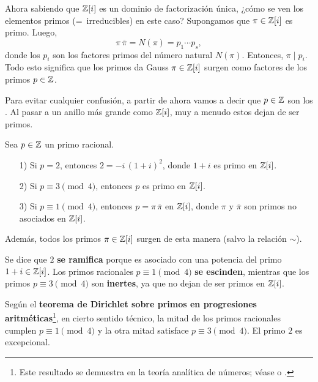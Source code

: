 Ahora sabiendo que $\mathbb{Z} [i]$ es un dominio de factorización única, ¿cómo se ven
los elementos primos (=~irreducibles) en este caso? Supongamos que
$\pi \in \mathbb{Z} [i]$ es primo. Luego,
$$\pi \, \overline{\pi} = N (\pi) = p_1\cdots p_s,$$
donde los $p_i$ son los factores primos del número natural $N (\pi)$. Entonces,
$\pi \mid p_i$. Todo esto significa que los primos da Gauss $\pi \in \mathbb{Z} [i]$
surgen como factores de los primos $p \in \mathbb{Z}$.

Para evitar cualquier confusión, a partir de ahora vamos a decir que $p\in \mathbb{Z}$
son los . Al pasar a un anillo más grande como
$\mathbb{Z} [i]$, muy a menudo estos dejan de ser primos.

\begin{proposicion}
  Sea $p \in \mathbb{Z}$ un primo racional.

  \begin{itemize}
  \item[1)] Si $p = 2$, entonces $2 = -i\,(1+i)^2$, donde $1+i$ es primo
    en $\mathbb{Z} [i]$.

  \item[2)] Si $p \equiv 3 \pmod{4}$, entonces $p$ es primo en $\mathbb{Z} [i]$.

  \item[3)] Si $p \equiv 1 \pmod{4}$, entonces $p = \pi\,\overline{\pi}$
    en $\mathbb{Z} [i]$, donde $\pi$ y $\overline{\pi}$ son primos no asociados
    en $\mathbb{Z} [i]$.
  \end{itemize}

  Además, todos los primos $\pi \in \mathbb{Z} [i]$ surgen de esta manera
  (salvo la relación $\sim$).
\end{proposicion}

Se dice que $2$ \textbf{se ramifica} porque es asociado con una potencia del
primo $1+i \in \mathbb{Z} [i]$. Los primos racionales $p \equiv 1 \pmod{4}$
\textbf{se escinden}, mientras que los primos $p \equiv 3 \pmod{4}$ son
\textbf{inertes}, ya que no dejan de ser primos en $\mathbb{Z} [i]$.

Según el \textbf{teorema de Dirichlet sobre primos en progresiones
  aritméticas}\footnote{Este resultado se demuestra en la teoría analítica de
  números; véase \cite[Chapter~16]{Ireland-Rosen} o
  \cite[Chapter~7]{Apostol-analytic}.}, en cierto sentido técnico, la mitad de
los primos racionales cumplen $p \equiv 1 \pmod{4}$ y la otra mitad satisface
$p \equiv 3 \pmod{4}$. El primo $2$ es excepcional.

